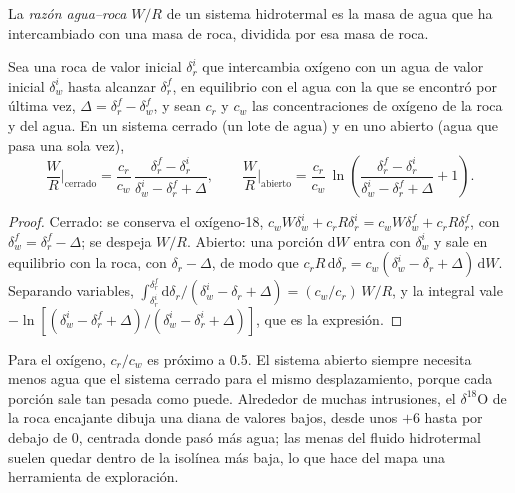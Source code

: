 \begin{definition}\label{def:b3:water-rock-interaction:water-rock-ratio}
La \emph{razón agua--roca} $W/R$ de un
sistema hidrotermal es la masa de agua que ha intercambiado con una masa de
roca, dividida por esa masa de roca.
\end{definition}

\begin{proposition}\label{prop:b3:water-rock-interaction:wr}
Sea una roca de valor inicial $\delta_r^i$ que intercambia oxígeno con un agua de
valor inicial $\delta_w^i$ hasta alcanzar $\delta_r^f$, en equilibrio con el agua
con la que se encontró por última vez, $\Delta = \delta_r^f - \delta_w^f$, y sean $c_r$ y $c_w$
las concentraciones de oxígeno de la roca y del agua. En un sistema cerrado (un lote de
agua) y en uno abierto (agua que pasa una sola vez),
\[
\frac WR\Big|_{\text{cerrado}} = \frac{c_r}{c_w}\,
\frac{\delta_r^f - \delta_r^i}{\delta_w^i - \delta_r^f + \Delta},
\qquad
\frac WR\Big|_{\text{abierto}} = \frac{c_r}{c_w}\,
\ln\!\left(\frac{\delta_r^f - \delta_r^i}{\delta_w^i - \delta_r^f + \Delta} + 1\right).
\]
\end{proposition}

\begin{proof}
Cerrado: se conserva el oxígeno-18, $c_wW\delta_w^i + c_rR\delta_r^i = c_wW
\delta_w^f + c_rR\delta_r^f$, con $\delta_w^f = \delta_r^f - \Delta$; se despeja
$W/R$. Abierto: una porción $\mathrm dW$ entra con $\delta_w^i$ y sale en
equilibrio con la roca, con $\delta_r - \Delta$, de modo que $c_rR\,\mathrm d\delta_r
= c_w(\delta_w^i - \delta_r + \Delta)\,\mathrm dW$. Separando variables,
$\int_{\delta_r^i}^{\delta_r^f}\mathrm d\delta_r/(\delta_w^i - \delta_r +
\Delta) = (c_w/c_r)\,W/R$, y la integral vale $-\ln[(\delta_w^i - \delta_r^f
+ \Delta)/(\delta_w^i - \delta_r^i + \Delta)]$, que es la expresión.
\end{proof}

Para el oxígeno, $c_r/c_w$ es próximo a 0.5. El sistema abierto siempre necesita menos
agua que el sistema cerrado para el mismo desplazamiento, porque cada porción sale
tan pesada como puede. Alrededor de muchas intrusiones, el $\delta^{18}\mathrm O$ de la
roca encajante dibuja una diana de valores bajos, desde unos $+6$ hasta por debajo de
0, centrada donde pasó más agua; las menas del fluido hidrotermal
suelen quedar dentro de la isolínea más baja, lo que hace del mapa una
herramienta de exploración.

